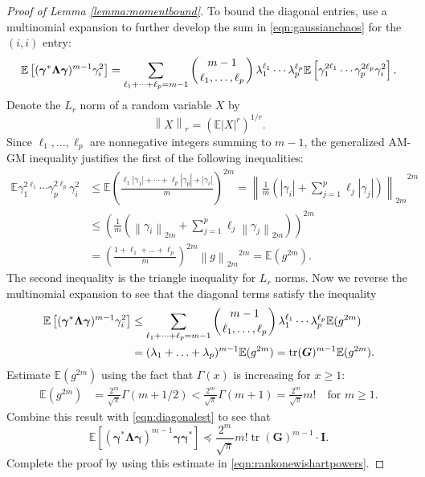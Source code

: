 \documentclass[11pt,letterpaper,twoside,reqno,nosumlimits]{amsart}
\renewcommand{\star}{*}
\newcommand{\mat}[1]{\ensuremath{\bm{#1}}} %
\renewcommand{\vec}[1]{\ensuremath{\bm{#1}}}
\newcommand{\E}{\ensuremath{\mathbb{E}}}
\newcommand{\lnorm}[2]{\ensuremath{\left\| #2 \right\|_{#1}}}
\DeclareMathOperator{\tr}{tr}
\theoremstyle{remark}
\numberwithin{equation}{section}
\numberwithin{thm}{section}
\numberwithin{prop}{section}
\numberwithin{defn}{section}
\numberwithin{remark}{section}
\begin{document}
\begin{proof}[Proof of Lemma \ref{lemma:momentbound}]
To bound the diagonal entries, use a multinomial expansion to further develop the sum in \eqref{eqn:gaussianchaos} for the $(i,i)$ entry:
\[
 \E\left[(\vec{\gamma}^\star \mat{\Lambda} \vec{\gamma})^{m-1} \gamma_i^2 \right]  
= \sum_{\ell_1 + \cdots +\ell_p = m-1} \left({m-1 \atop \ell_1, \ldots, \ell_p } \right) \lambda_1^{\ell_1} \cdots \lambda_p^{\ell_p} \E\left[\gamma_1^{2\ell_1} \cdots \gamma_p^{2\ell_p} \gamma_i^2 \right].
\]
Denote the $L_r$ norm of a random variable $X$ by
\[ 
  \lnorm{r}{X} = \left(\E |X|^r \right)^{1/r}. 
\]
Since $\ell_1, \ldots, \ell_p$ are nonnegative integers summing to $m-1$, the generalized AM-GM inequality justifies the first of the following inequalities:
\begin{align*}
\E \gamma_1^{2\ell_1} \cdots \gamma_p^{2\ell_p} \gamma_i^2 & \leq  \E \left(\frac{\ell_1 |\gamma_1| + \cdots + \ell_p |\gamma_p| + |\gamma_i|}{m}\right)^{2m} =
 \lnorm{2m}{ \frac{1}{m} \left(|\gamma_i| + \sum_{j=1}^p \ell_j |\gamma_j| \right) }^{2m} \\
 & \leq \left( \frac{1}{m} \left( \lnorm{2m}{\gamma_i} + \sum_{j=1}^p \ell_j \lnorm{2m}{\gamma_j} \right) \right)^{2m} \\
 & = \left(\frac{1 + \ell_1 + \ldots + \ell_p}{m} \right)^{2m} \lnorm{2m}{g}^{2m} = \E (g^{2m}).  
\end{align*}
The second inequality is the triangle inequality for $L_r$ norms. Now we reverse the multinomial expansion to see that the diagonal terms satisfy the inequality
\begin{align}
\E\left[(\vec{\gamma}^\star \mat{\Lambda} \vec{\gamma})^{m-1}\gamma_i^2\right] & \leq \sum_{\ell_1 + \cdots + \ell_p = m-1} \left({ m-1 \atop \ell_1, \ldots, \ell_p }\right) \lambda_1^{\ell_1} \cdots \lambda_p^{\ell_p} \E (g^{2m}) \notag \\
&  = (\lambda_1 + \ldots + \lambda_p)^{m-1}\E ( g^{2m}) = \tr(\mat{G})^{m-1} \E (g^{2m}). 
\label{eqn:diagonalest}
\end{align}
Estimate $\E(g^{2m})$ using the fact that $\Gamma(x)$ is increasing for $x \geq 1:$
\begin{align*}
\E \left( g^{2m} \right) & = \frac{2^m}{\sqrt{\pi}} \Gamma(m + 1/2) < \frac{2^m}{\sqrt{\pi}} \Gamma(m+1) = \frac{2^m}{\sqrt{\pi}} m! \quad \text{for } m \geq 1.
\end{align*}
Combine this result with \eqref{eqn:diagonalest} to see that
\[
\E\left[(\vec{\gamma}^\star \mat{\Lambda} \vec{\gamma})^{m-1}\vec{\gamma}\vec{\gamma}^\star \right] \preceq \frac{2^m}{\sqrt{\pi}} m! \tr(\mat{G})^{m-1} \cdot \mathbf{I}. 
\] 
Complete the proof by using this estimate in \eqref{eqn:rankonewishartpowers}.

\end{proof}
\end{document}
